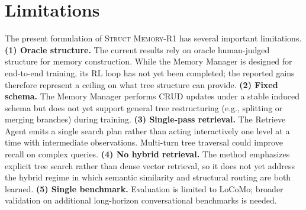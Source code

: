 \section{Limitations}
The present formulation of \textsc{Struct Memory-R1} has several important limitations.
\textbf{(1) Oracle structure.} The current results rely on oracle human-judged structure for memory construction. While the Memory Manager is designed for end-to-end training, its RL loop has not yet been completed; the reported gains therefore represent a ceiling on what tree structure can provide.
\textbf{(2) Fixed schema.} The Memory Manager performs CRUD updates under a stable induced schema but does not yet support general tree restructuring (e.g., splitting or merging branches) during training.
\textbf{(3) Single-pass retrieval.} The Retrieve Agent emits a single search plan rather than acting interactively one level at a time with intermediate observations. Multi-turn tree traversal could improve recall on complex queries.
\textbf{(4) No hybrid retrieval.} The method emphasizes explicit tree search rather than dense vector retrieval, so it does not yet address the hybrid regime in which semantic similarity and structural routing are both learned.
\textbf{(5) Single benchmark.} Evaluation is limited to LoCoMo; broader validation on additional long-horizon conversational benchmarks is needed.
